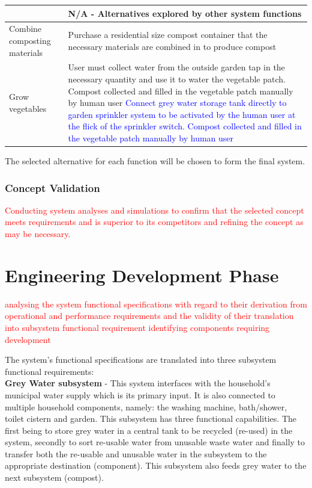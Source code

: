 \documentclass[a4paper,11pt,fleqn]{report}
\begin{document}
\begin{table}[h!]
\begin{center}
\begin{tabular}{p{3.5cm}|p{9cm}}
{    \hline
    Integrate water, recycling and composting & N/A - Alternatives explored by other system functions\\
    \hline
     Combine composting materials & Purchase a residential size compost container that the necessary materials are combined in to produce compost\\
    \hline
     Grow vegetables & User must collect water from the outside garden tap in the necessary quantity and use it to water the vegetable patch. Compost collected and filled in the vegetable patch manually by human user \textcolor{blue}{Connect grey water storage tank directly to garden sprinkler system to be activated by the human user at the flick of the sprinkler switch. Compost collected and filled in the vegetable patch manually by human user}\\
    \hline
    \bottomrule
\end{tabular}
\end{center}
\end{table}
%
The selected alternative for each function will be chosen to form the final system.

\subsection{Concept Validation}
\textcolor{red}{Conducting system analyses and simulations to confirm that the selected concept meets requirements and is superior to its competitors and refining the concept as may be necessary.}

\chapter{Engineering Development Phase}
\textcolor{red}{analysing the system functional specifications with regard to their derivation from operational and performance requirements and the validity of their translation into subsystem functional requirement identifying components requiring development}

The system's functional specifications are translated into three subsystem functional requirements:\\

\textbf{Grey Water subsystem} - This system interfaces with the household's municipal water supply which is its primary input. It is also connected to multiple household components, namely: the washing machine, bath/shower, toilet cistern and garden. This subsystem has three functional capabilities. The first being to store grey water in a central tank to be recycled (re-used) in the system, secondly to sort re-usable water from unusable waste water and finally to transfer both the re-usable and unusable water in the subsystem to the appropriate destination (component). This subsystem also feeds grey water to the next subsystem (compost).\\
\end{document}
